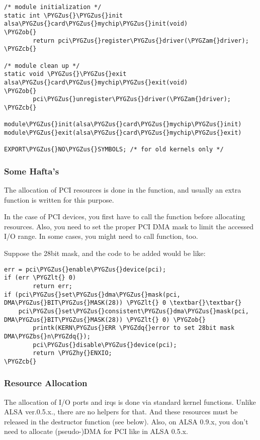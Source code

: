 \documentclass[a4paper,8pt,english]{sphinxmanual}
\def\PYGZbs{\char`\\}
\def\PYGZus{\char`\_}
\def\PYGZob{\char`\{}
\def\PYGZcb{\char`\}}
\def\PYGZam{\char`\&}
\def\PYGZlt{\char`\<}
\def\PYGZhy{\char`\-}
\def\PYGZdq{\char`\"}
\begin{document}
\begin{Verbatim}[commandchars=\\\{\}]
/* module initialization */
static int \PYGZus{}\PYGZus{}init alsa\PYGZus{}card\PYGZus{}mychip\PYGZus{}init(void)
\PYGZob{}
        return pci\PYGZus{}register\PYGZus{}driver(\PYGZam{}driver);
\PYGZcb{}

/* module clean up */
static void \PYGZus{}\PYGZus{}exit alsa\PYGZus{}card\PYGZus{}mychip\PYGZus{}exit(void)
\PYGZob{}
        pci\PYGZus{}unregister\PYGZus{}driver(\PYGZam{}driver);
\PYGZcb{}

module\PYGZus{}init(alsa\PYGZus{}card\PYGZus{}mychip\PYGZus{}init)
module\PYGZus{}exit(alsa\PYGZus{}card\PYGZus{}mychip\PYGZus{}exit)

EXPORT\PYGZus{}NO\PYGZus{}SYMBOLS; /* for old kernels only */
\end{Verbatim}


\subsubsection{Some Hafta's}
\label{sound/kernel-api/writing-an-alsa-driver:some-hafta-s}
The allocation of PCI resources is done in the  function, and
usually an extra  function is written for this
purpose.

In the case of PCI devices, you first have to call the
 function before allocating
resources. Also, you need to set the proper PCI DMA mask to limit the
accessed I/O range. In some cases, you might need to call
 function, too.

Suppose the 28bit mask, and the code to be added would be like:

\begin{Verbatim}[commandchars=\\\{\}]
err = pci\PYGZus{}enable\PYGZus{}device(pci);
if (err \PYGZlt{} 0)
        return err;
if (pci\PYGZus{}set\PYGZus{}dma\PYGZus{}mask(pci, DMA\PYGZus{}BIT\PYGZus{}MASK(28)) \PYGZlt{} 0 \textbar{}\textbar{}
    pci\PYGZus{}set\PYGZus{}consistent\PYGZus{}dma\PYGZus{}mask(pci, DMA\PYGZus{}BIT\PYGZus{}MASK(28)) \PYGZlt{} 0) \PYGZob{}
        printk(KERN\PYGZus{}ERR \PYGZdq{}error to set 28bit mask DMA\PYGZbs{}n\PYGZdq{});
        pci\PYGZus{}disable\PYGZus{}device(pci);
        return \PYGZhy{}ENXIO;
\PYGZcb{}
\end{Verbatim}


\subsubsection{Resource Allocation}
\label{sound/kernel-api/writing-an-alsa-driver:resource-allocation}
The allocation of I/O ports and irqs is done via standard kernel
functions. Unlike ALSA ver.0.5.x., there are no helpers for that. And
these resources must be released in the destructor function (see below).
Also, on ALSA 0.9.x, you don't need to allocate (pseudo-)DMA for PCI
like in ALSA 0.5.x.
\end{document}
